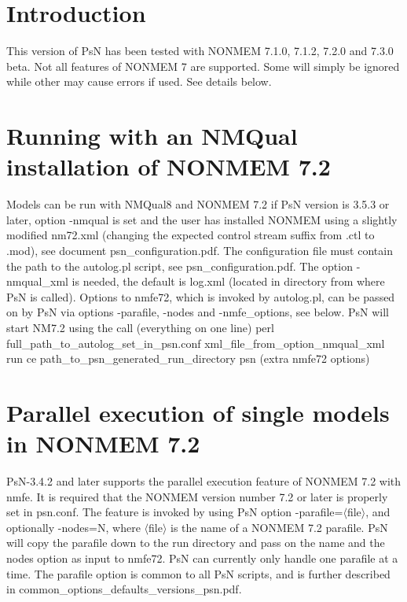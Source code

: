 


\maketitle


\section{Introduction}
This version of PsN has been tested with NONMEM 7.1.0, 7.1.2,  7.2.0 and 7.3.0 beta. Not all features of NONMEM 7 are supported. Some will simply be ignored while other may cause errors if used. See details below.

\section{Running with an NMQual installation of NONMEM 7.2}
Models can be run with NMQual8 and NONMEM 7.2 if PsN version is 3.5.3 or later, option -nmqual is set and the user has installed NONMEM using a slightly modified nm72.xml (changing the expected control stream suffix from .ctl to .mod), see document psn\_configuration.pdf. The configuration file must contain the path to the autolog.pl script, see psn\_configuration.pdf. The option -nmqual\_xml is needed, the default is log.xml (located in directory from where PsN is called). Options to nmfe72, which is invoked by autolog.pl, can be passed on by PsN via options -parafile, -nodes and -nmfe\_options, see below. PsN will start NM7.2 using the call (everything on one line)
perl    full\_path\_to\_autolog\_set\_in\_psn.conf    xml\_file\_from\_option\_nmqual\_xml    run    ce path\_to\_psn\_generated\_run\_directory    psn (extra nmfe72 options)


\section{Parallel execution of single models in NONMEM 7.2}
PsN-3.4.2 and later supports the parallel execution feature of NONMEM 7.2 with nmfe. It is required that the NONMEM version number 7.2 or later is properly set in psn.conf. 
The feature is invoked by using PsN option -parafile=$\langle$file$\rangle$, and optionally -nodes=N, where $\langle$file$\rangle$ is the name of a NONMEM 7.2 parafile. PsN will copy the parafile down to the run directory and pass on the name and the nodes option as input to nmfe72. PsN can currently only handle one parafile at a time. The parafile option is common to all PsN scripts, and is further described in common\_options\_defaults\_versions\_psn.pdf.

